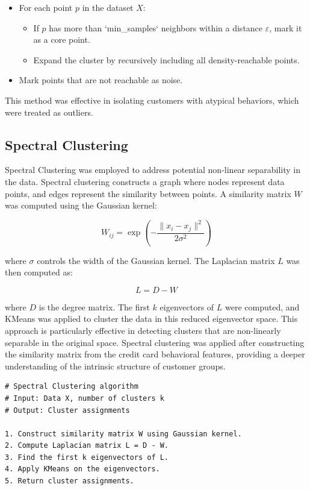 \documentclass[runningheads,a4paper]{llncs}
\begin{document}
\begin{itemize}
    \item For each point \( p \) in the dataset \( X \):
    \begin{itemize}
        \item If \( p \) has more than `min\_samples` neighbors within a distance \( \varepsilon \), mark it as a core point.
        \item Expand the cluster by recursively including all density-reachable points.
    \end{itemize}
    \item Mark points that are not reachable as noise.
\end{itemize}

This method was effective in isolating customers with atypical behaviors, which were treated as outliers.

\subsection{Spectral Clustering}

Spectral Clustering was employed to address potential non-linear separability in the data. Spectral clustering constructs a graph where nodes represent data points, and edges represent the similarity between points. A similarity matrix \( W \) was computed using the Gaussian kernel:

\begin{equation}
W_{ij} = \exp\left(-\frac{\| x_i - x_j \|^2}{2\sigma^2}\right)
\end{equation}

where \( \sigma \) controls the width of the Gaussian kernel. The Laplacian matrix \( L \) was then computed as:

\begin{equation}
L = D - W
\end{equation}

where \( D \) is the degree matrix. The first \( k \) eigenvectors of \( L \) were computed, and KMeans was applied to cluster the data in this reduced eigenvector space. This approach is particularly effective in detecting clusters that are non-linearly separable in the original space. Spectral clustering was applied after constructing the similarity matrix from the credit card behavioral features, providing a deeper understanding of the intrinsic structure of customer groups.

\begin{verbatim}
# Spectral Clustering algorithm
# Input: Data X, number of clusters k
# Output: Cluster assignments

1. Construct similarity matrix W using Gaussian kernel.
2. Compute Laplacian matrix L = D - W.
3. Find the first k eigenvectors of L.
4. Apply KMeans on the eigenvectors.
5. Return cluster assignments.
\end{verbatim}
\end{document}
